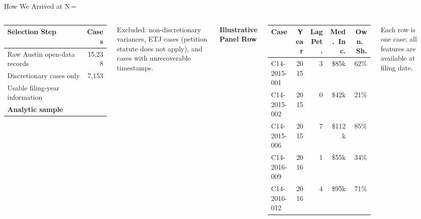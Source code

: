 \documentclass[10pt, aspectratio=169]{beamer}
\begin{document}
\begin{frame}{How We Arrived at N\,=\,\metricBaselineCases{}}
    \begin{columns}
        \small
        \begin{tabular}{lr}
            \toprule
            \textbf{Selection Step} & \textbf{Cases} \\
            \midrule
            Raw Austin open-data records & 15,238 \\
            Discretionary cases only & 7,153 \\
            Usable filing-year information & \metricBaselineCases{} \\
            \midrule
            \textbf{Analytic sample} & \textbf{\metricBaselineCases{}} \\
            \bottomrule
        \end{tabular}
        \vspace{0.8em}

        \footnotesize Excluded: non-discretionary variances, ETJ cases (petition statute does not apply), and cases with unrecoverable timestamps.

        \textbf{Illustrative Panel Row}
        \vspace{0.5em}
        \tiny
        \begin{tabular}{lrrrr}
            \toprule
            Case & Year & Lag Pet. & Med.\ Inc. & Own.\ Sh. \\
            \midrule
            C14-2015-001 & 2015 & 3 & \$85k & 62\% \\
            C14-2015-002 & 2015 & 0 & \$42k & 21\% \\
            C14-2015-006 & 2015 & 7 & \$112k & 85\% \\
            C14-2016-009 & 2016 & 1 & \$55k & 34\% \\
            C14-2016-012 & 2016 & 4 & \$95k & 71\% \\
            \bottomrule
        \end{tabular}
        \vspace{0.5em}

        \footnotesize Each row is one case; all features are available at filing date.
    \end{columns}
\end{frame}
\end{document}
